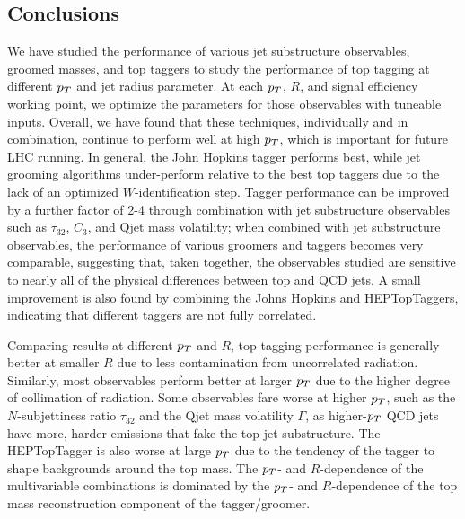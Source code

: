 %



\subsection{Conclusions}

We have studied the performance of various jet substructure observables, groomed masses, and top taggers to study the performance of top tagging at different $p_T$ and jet radius parameter. At each $p_T$, $R$, and signal efficiency working point, we optimize the parameters for those observables with tuneable inputs. Overall, we have found that these techniques, individually and in combination, continue to perform well at high $p_T$, which is important for future LHC running. In general, the John Hopkins tagger performs best, while jet grooming algorithms under-perform relative to the best top taggers due to the lack of an optimized $W$-identification step. Tagger performance can be improved by a further factor of 2-4 through combination with jet substructure observables such as $\tau_{32}$, $C_3$, and Qjet mass volatility; when combined with jet substructure observables, the performance of various groomers and taggers becomes very comparable, suggesting that, taken together, the observables studied are sensitive to nearly all of the physical differences between top and QCD jets. A small improvement is also found by combining the Johns Hopkins and HEPTopTaggers, indicating that different taggers are not fully correlated.

Comparing results at different $p_T$ and $R$, top tagging performance is generally better at smaller $R$ due to less contamination from uncorrelated radiation. Similarly, most observables perform better at larger $p_T$ due to the higher degree of collimation of radiation. Some observables fare worse at higher $p_T$, such as the $N$-subjettiness ratio $\tau_{32}$ and the Qjet mass volatility $\Gamma$, as higher-$p_T$ QCD jets have more, harder emissions that fake the top jet substructure. The HEPTopTagger is also worse at large $p_T$ due to the tendency of the tagger to shape backgrounds around the top mass. The $p_T$- and $R$-dependence of the multivariable combinations is dominated by the $p_T$- and $R$-dependence of the top mass reconstruction component of the tagger/groomer.

